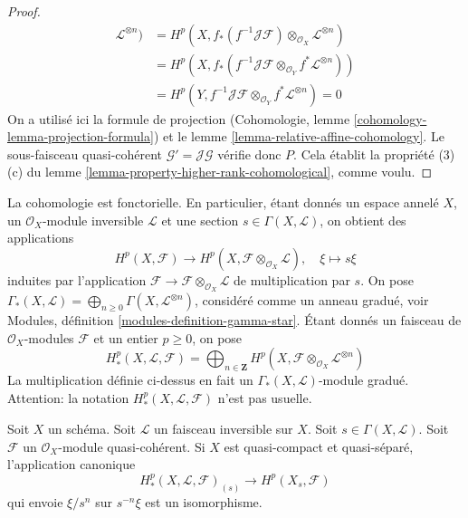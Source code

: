\begin{proof}
\begin{align*}
\mathcal{L}^{\otimes n})
& =
H^p(X, f_*(f^{-1}\mathcal{J}\mathcal{F}) \otimes_{\mathcal{O}_X}
\mathcal{L}^{\otimes n}) \\
& =
H^p(X, f_*(f^{-1}\mathcal{J}\mathcal{F} \otimes_{\mathcal{O}_Y}
f^*\mathcal{L}^{\otimes n})) \\
& =
H^p(Y, f^{-1}\mathcal{J}\mathcal{F} \otimes_{\mathcal{O}_Y}
f^*\mathcal{L}^{\otimes n}) = 0
\end{align*}
On a utilisé ici la formule de projection
(Cohomologie, lemme \ref{cohomology-lemma-projection-formula}) et le
lemme \ref{lemma-relative-affine-cohomology}.
Le sous-faisceau quasi-cohérent $\mathcal{G}' = \mathcal{J}\mathcal{G}$
vérifie donc $P$. Cela établit la propriété (3)(c) du
lemme \ref{lemma-property-higher-rank-cohomological}, comme voulu.
\end{proof}

\noindent
La cohomologie est fonctorielle. En particulier, étant donnés un espace annelé $X$,
un $\mathcal{O}_X$-module inversible $\mathcal{L}$ et une section
$s \in \Gamma(X, \mathcal{L})$, on obtient des applications
$$
H^p(X, \mathcal{F})
\longrightarrow
H^p(X, \mathcal{F} \otimes_{\mathcal{O}_X} \mathcal{L}), \quad
\xi \longmapsto s\xi
$$
induites par l'application
$\mathcal{F} \to \mathcal{F} \otimes_{\mathcal{O}_X} \mathcal{L}$
de multiplication par $s$. On pose
$\Gamma_*(X, \mathcal{L}) =
\bigoplus_{n \geq 0} \Gamma(X, \mathcal{L}^{\otimes n})$,
considéré comme un anneau gradué,
voir Modules, définition \ref{modules-definition-gamma-star}.
Étant donnés un faisceau de $\mathcal{O}_X$-modules $\mathcal{F}$ et un entier
$p \geq 0$, on pose
$$
H^p_*(X, \mathcal{L}, \mathcal{F}) =
\bigoplus\nolimits_{n \in \mathbf{Z}} H^p(X,
\mathcal{F} \otimes_{\mathcal{O}_X} \mathcal{L}^{\otimes n})
$$
La multiplication définie ci-dessus en fait un $\Gamma_*(X, \mathcal{L})$-module gradué. Attention:
la notation $H^p_*(X, \mathcal{L}, \mathcal{F})$
n'est pas usuelle.

\begin{lemma}
\label{lemma-invert-s-cohomology}
Soit $X$ un schéma. Soit $\mathcal{L}$ un faisceau inversible sur $X$.
Soit $s \in \Gamma(X, \mathcal{L})$.
Soit $\mathcal{F}$ un $\mathcal{O}_X$-module quasi-cohérent.
Si $X$ est quasi-compact et quasi-séparé, l'application canonique
$$
H^p_*(X, \mathcal{L}, \mathcal{F})_{(s)}
\longrightarrow
H^p(X_s, \mathcal{F})
$$
qui envoie $\xi/s^n$ sur $s^{-n}\xi$ est un isomorphisme.
\end{lemma}

